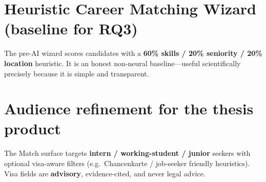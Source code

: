 \section{Heuristic Career Matching Wizard (baseline for RQ3)}

The pre-AI wizard scores candidates with a \textbf{60\% skills / 20\% seniority / 20\% location} heuristic. It is an honest non-neural baseline---useful scientifically precisely because it is simple and transparent.

\section{Audience refinement for the thesis product}

The Match surface targets \textbf{intern / working-student / junior} seekers with optional visa-aware filters (e.g.\ Chancenkarte / job-seeker friendly heuristics). Visa fields are \textbf{advisory}, evidence-cited, and never legal advice.

